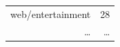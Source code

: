 \documentclass[xcolor=x11names,compress]{beamer}
\begin{document}
{\begin{columns}
\begin{table}[ht]
\begin{tabular}{rr}
                web/entertainment &  28 \\ 
                \ldots & \ldots \\

\end{tabular}
\end{table}
\end{columns}}
\end{document}
